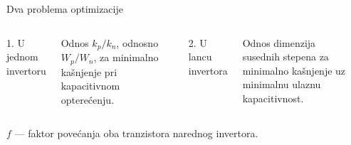 \begin{frame}[label=09_3-s005]{Dva problema optimizacije}
\begin{columns}[c,onlytextwidth]
\alert{1. U jednom invertoru}\par Odnos $k_p/k_n$, odnosno $W_p/W_n$, za minimalno kašnjenje pri kapacitivnom opterećenju.\begin{center}

\end{center}
\alert{2. U lancu invertora}\par Odnos dimenzija susednih stepena za minimalno kašnjenje uz minimalnu ulaznu kapacitivnost.\begin{center}

\end{center}
\end{columns}\bigskip $f$ — faktor povećanja oba tranzistora narednog invertora.
\end{frame}
